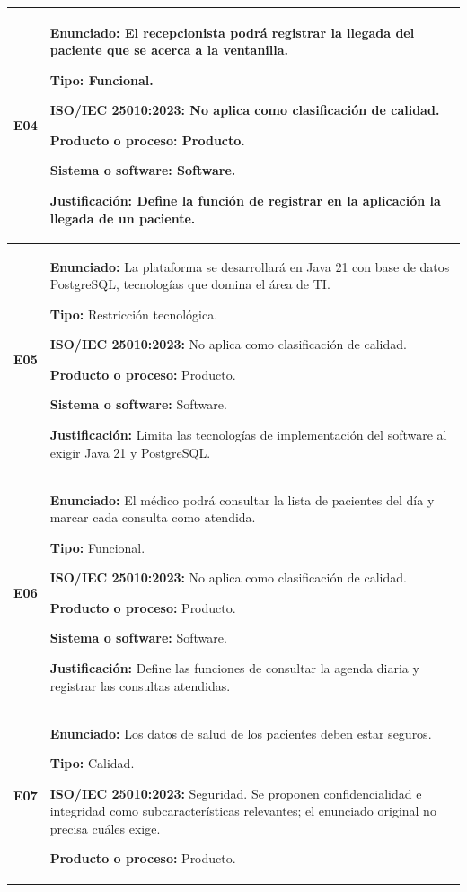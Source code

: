 \documentclass[11pt,a4paper]{article}
\begin{document}
\begin{longtable}{|
    p{}|
    p{}|}
\textbf{E04} &
\textbf{Enunciado:}
El recepcionista podrá registrar la llegada del
paciente que se acerca a la ventanilla.

\textbf{Tipo:} Funcional.

\textbf{ISO/IEC 25010:2023:}
No aplica como clasificación de calidad.

\textbf{Producto o proceso:} Producto.

\textbf{Sistema o software:} Software.

\textbf{Justificación:}
Define la función de registrar en la aplicación
la llegada de un paciente.
\\
\hline

\textbf{E05} &
\textbf{Enunciado:}
La plataforma se desarrollará en Java 21 con
base de datos PostgreSQL, tecnologías que
domina el área de TI.

\textbf{Tipo:} Restricción tecnológica.

\textbf{ISO/IEC 25010:2023:}
No aplica como clasificación de calidad.

\textbf{Producto o proceso:} Producto.

\textbf{Sistema o software:} Software.

\textbf{Justificación:}
Limita las tecnologías de implementación del
software al exigir Java 21 y PostgreSQL.
\\
\hline

\textbf{E06} &
\textbf{Enunciado:}
El médico podrá consultar la lista de pacientes
del día y marcar cada consulta como atendida.

\textbf{Tipo:} Funcional.

\textbf{ISO/IEC 25010:2023:}
No aplica como clasificación de calidad.

\textbf{Producto o proceso:} Producto.

\textbf{Sistema o software:} Software.

\textbf{Justificación:}
Define las funciones de consultar la agenda
diaria y registrar las consultas atendidas.
\\
\hline

\textbf{E07} &
\textbf{Enunciado:}
Los datos de salud de los pacientes deben
estar seguros.

\textbf{Tipo:} Calidad.

\textbf{ISO/IEC 25010:2023:}
Seguridad. Se proponen confidencialidad e
integridad como subcaracterísticas relevantes;
el enunciado original no precisa cuáles exige.

\textbf{Producto o proceso:} Producto.


\end{longtable}
\end{document}
